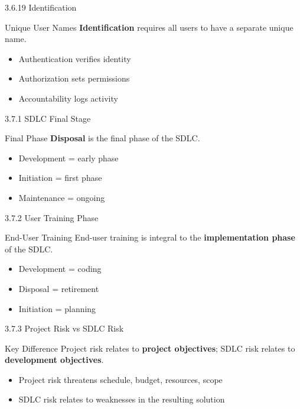 \documentclass{beamer}
\begin{document}
	\begin{frame}{3.6.19 Identification}
		\begin{block}{Unique User Names}
			\textbf{Identification} requires all users to have a separate unique name.
		\end{block}
		\begin{itemize}
			\item Authentication verifies identity
			\item Authorization sets permissions
			\item Accountability logs activity
		\end{itemize}
	\end{frame}
	
	\begin{frame}{3.7.1 SDLC Final Stage}
		\begin{block}{Final Phase}
			\textbf{Disposal} is the final phase of the SDLC.
		\end{block}
		\begin{itemize}
			\item Development = early phase
			\item Initiation = first phase
			\item Maintenance = ongoing
		\end{itemize}
	\end{frame}
	
	\begin{frame}{3.7.2 User Training Phase}
		\begin{block}{End-User Training}
			End-user training is integral to the \textbf{implementation phase} of the SDLC.
		\end{block}
		\begin{itemize}
			\item Development = coding
			\item Disposal = retirement
			\item Initiation = planning
		\end{itemize}
	\end{frame}
	
	\begin{frame}{3.7.3 Project Risk vs SDLC Risk}
		\begin{block}{Key Difference}
			Project risk relates to \textbf{project objectives}; SDLC risk relates to \textbf{development objectives}.
		\end{block}
		\begin{itemize}
			\item Project risk threatens schedule, budget, resources, scope
			\item SDLC risk relates to weaknesses in the resulting solution
		\end{itemize}
	\end{frame}
	
\end{document}
